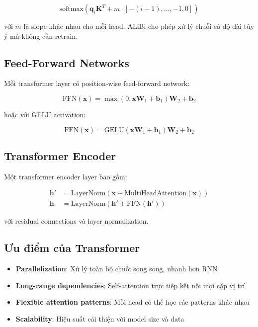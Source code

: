 \begin{equation}
\text{softmax}\left(\mathbf{q}_i \mathbf{K}^T + m \cdot [-(i-1), \ldots, -1, 0]\right)
\end{equation}

với $m$ là slope khác nhau cho mỗi head. ALiBi cho phép xử lý chuỗi có độ dài tùy ý mà không cần retrain.

\subsection{Feed-Forward Networks}

Mỗi transformer layer có position-wise feed-forward network:

\begin{equation}
\text{FFN}(\mathbf{x}) = \max(0, \mathbf{x}\mathbf{W}_1 + \mathbf{b}_1)\mathbf{W}_2 + \mathbf{b}_2
\end{equation}

hoặc với GELU activation:

\begin{equation}
\text{FFN}(\mathbf{x}) = \text{GELU}(\mathbf{x}\mathbf{W}_1 + \mathbf{b}_1)\mathbf{W}_2 + \mathbf{b}_2
\end{equation}

\subsection{Transformer Encoder}

Một transformer encoder layer bao gồm:

\begin{align}
\mathbf{h}' &= \text{LayerNorm}(\mathbf{x} + \text{MultiHeadAttention}(\mathbf{x})) \\
\mathbf{h} &= \text{LayerNorm}(\mathbf{h}' + \text{FFN}(\mathbf{h}'))
\end{align}

với residual connections và layer normalization.

\subsection{Ưu điểm của Transformer}

\begin{itemize}
    \item \textbf{Parallelization}: Xử lý toàn bộ chuỗi song song, nhanh hơn RNN
    \item \textbf{Long-range dependencies}: Self-attention trực tiếp kết nối mọi cặp vị trí
    \item \textbf{Flexible attention patterns}: Mỗi head có thể học các patterns khác nhau
    \item \textbf{Scalability}: Hiệu suất cải thiện với model size và data
\end{itemize}


